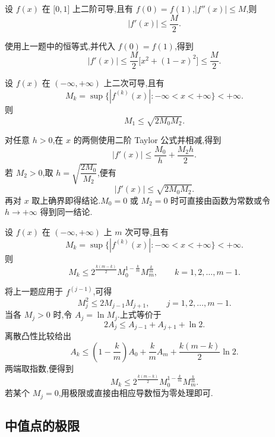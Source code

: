 \begin{example}
    设 $f(x)$ 在 $\lbrack 0,1\rbrack$ 上二阶可导,且有 $f(0)=f(1)$,$|f''(x)|\leq M$,则
    \[
        |f'(x)|\leq\dfrac{M}{2}.
    \]
\end{example}
\exampleblank

\begin{solution}
    使用上一题中的恒等式,并代入 $f(0)=f(1)$,得到
    \[
        |f'(x)|
        \leq\dfrac{M}{2}\bigl[x^2+(1-x)^2\bigr]
        \leq\dfrac{M}{2}.
    \]
\end{solution}

\begin{example}[\markstar]
    设 $f(x)$ 在 $(-\infty,+\infty)$ 上二次可导,且有
    \[
        M_k=\sup\{|f^{(k)}(x)|:-\infty<x<+\infty\}<+\infty.
    \]
    则
    \[
        M_1\leq\sqrt{2M_0M_2}.
    \]
\end{example}
\exampleblank

\begin{solution}
    对任意 $h>0$,在 $x$ 的两侧使用二阶 Taylor 公式并相减,得到
    \[
        |f'(x)|\leq\dfrac{M_0}{h}+\dfrac{M_2h}{2}.
    \]
    若 $M_2>0$,取 $h=\sqrt{\dfrac{2M_0}{M_2}}$,便有
    \[
        |f'(x)|\leq\sqrt{2M_0M_2}.
    \]
    再对 $x$ 取上确界即得结论.$M_0=0$ 或 $M_2=0$ 时可直接由函数为常数或令 $h\to+\infty$ 得到同一结论.
\end{solution}

\begin{example}[\markstar]
    设 $f(x)$ 在 $(-\infty,+\infty)$ 上 $m$ 次可导,且有
    \[
        M_k=\sup\{|f^{(k)}(x)|:-\infty<x<+\infty\}<+\infty.
    \]
    则
    \[
        M_k\leq2^{\frac{k(m-k)}{2}}M_0^{1-\frac{k}{m}}M_m^{\frac{k}{m}},
        \qquad k=1,2,\ldots,m-1.
    \]
\end{example}
\exampleblank

\begin{solution}
    将上一题应用于 $f^{(j-1)}$,可得
    \[
        M_j^2\leq2M_{j-1}M_{j+1},
        \qquad j=1,2,\ldots,m-1.
    \]
    当各 $M_j>0$ 时,令 $A_j=\ln M_j$.上式等价于
    \[
        2A_j\leq A_{j-1}+A_{j+1}+\ln2.
    \]
    离散凸性比较给出
    \[
        A_k\leq\left(1-\dfrac{k}{m}\right)A_0
        +\dfrac{k}{m}A_m+\dfrac{k(m-k)}{2}\ln2.
    \]
    两端取指数,便得到
    \[
        M_k\leq2^{\frac{k(m-k)}{2}}
        M_0^{1-\frac{k}{m}}M_m^{\frac{k}{m}}.
    \]
    若某个 $M_j=0$,用极限或直接由相应导数恒为零处理即可.
\end{solution}



\subsection{中值点的极限}

